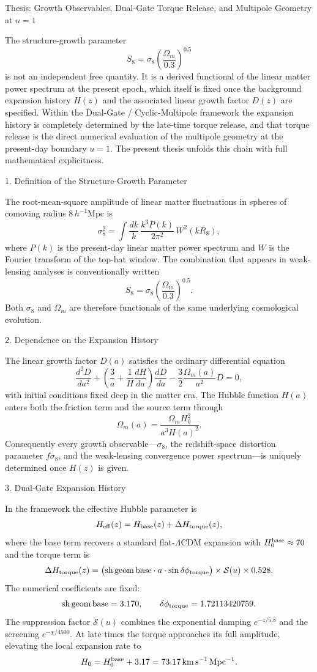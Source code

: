 Thesis: Growth Observables, Dual-Gate Torque Release, and Multipole Geometry at \(u=1\)

The structure-growth parameter  
\[
S_8=\sigma_8\left(\frac{\Omega_m}{0.3}\right)^{0.5}
\]  
is not an independent free quantity. It is a derived functional of the linear matter power spectrum at the present epoch, which itself is fixed once the background expansion history \(H(z)\) and the associated linear growth factor \(D(z)\) are specified. Within the Dual-Gate / Cyclic-Multipole framework the expansion history is completely determined by the late-time torque release, and that torque release is the direct numerical evaluation of the multipole geometry at the present-day boundary \(u=1\). The present thesis unfolds this chain with full mathematical explicitness.

1. Definition of the Structure-Growth Parameter

The root-mean-square amplitude of linear matter fluctuations in spheres of comoving radius \(8\,h^{-1}\mathrm{Mpc}\) is
\[
\sigma_8^2=\int\frac{dk}{k}\,\frac{k^3P(k)}{2\pi^2}\,W^2(kR_8),
\]  
where \(P(k)\) is the present-day linear matter power spectrum and \(W\) is the Fourier transform of the top-hat window. The combination that appears in weak-lensing analyses is conventionally written
\[
S_8=\sigma_8\left(\frac{\Omega_m}{0.3}\right)^{0.5}.
\]  
Both \(\sigma_8\) and \(\Omega_m\) are therefore functionals of the same underlying cosmological evolution.

2. Dependence on the Expansion History

The linear growth factor \(D(a)\) satisfies the ordinary differential equation
\[
\frac{d^2D}{da^2}+\left(\frac{3}{a}+\frac{1}{H}\frac{dH}{da}\right)\frac{dD}{da}-\frac{3}{2}\frac{\Omega_m(a)}{a^2}D=0,
\]  
with initial conditions fixed deep in the matter era. The Hubble function \(H(a)\) enters both the friction term and the source term through
\[
\Omega_m(a)=\frac{\Omega_m H_0^2}{a^3H(a)^2}.
\]  
Consequently every growth observable—\(\sigma_8\), the redshift-space distortion parameter \(f\sigma_8\), and the weak-lensing convergence power spectrum—is uniquely determined once \(H(z)\) is given.

3. Dual-Gate Expansion History

In the framework the effective Hubble parameter is
\[
H_{\rm eff}(z)=H_{\rm base}(z)+\Delta H_{\rm torque}(z),
\]  
where the base term recovers a standard flat-\(\Lambda\)CDM expansion with \(H_0^{\rm base}\approx70\) and the torque term is
\[
\Delta H_{\rm torque}(z)=\bigl({\rm sh\,geom\,base}\cdot a\cdot\sin\delta\phi_{\rm torque}\bigr)\times\mathcal{S}(u)\times0.528.
\]  
The numerical coefficients are fixed:
\[
{\rm sh\,geom\,base}=3.170,\qquad\delta\phi_{\rm torque}=1.72113420759.
\]  
The suppression factor \(\mathcal{S}(u)\) combines the exponential damping \(e^{-z/5.8}\) and the screening \(e^{-\chi/4500}\). At late times the torque approaches its full amplitude, elevating the local expansion rate to
\[
H_0=H_0^{\rm base}+3.17=73.17\,\mathrm{km\,s^{-1}\,Mpc^{-1}}.
\]

